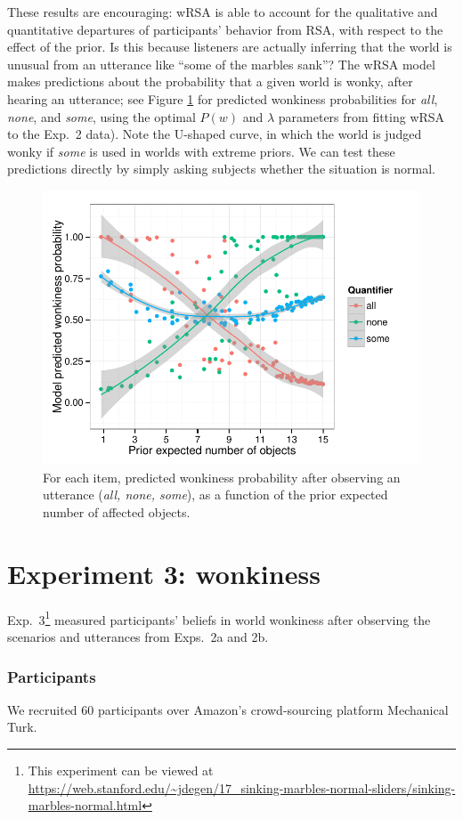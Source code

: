 \documentclass[10pt,letterpaper]{article}
\newcommand{\figref}[1]{Figure \ref{#1}}
\begin{document}
These results are encouraging: wRSA is able to account for the qualitative and quantitative departures of participants' behavior from RSA, with respect to the effect of the prior.
Is this because listeners are actually inferring that the world is unusual from an utterance like ``some of the marbles sank''?
The wRSA model makes predictions about the probability that a given world is wonky, after hearing an utterance; see \figref{fig:wonkymodel} for predicted wonkiness probabilities for \emph{all}, \emph{none}, and \emph{some}, using the  optimal $P(w)$ and $\lambda$ parameters from fitting wRSA to the Exp.~2 data).
Note the U-shaped curve, in which the world is judged wonky if \emph{some} is used in worlds with extreme priors.
 We can test these predictions directly by simply asking subjects whether the situation is normal.



\begin{figure}
	\includegraphics[width=.5\textwidth]{pics/model-wonkiness-uniform}
	\caption{For each item, predicted wonkiness probability after observing an utterance (\emph{all, none, some}), as a function of the prior expected number of affected objects.}
	\label{fig:wonkymodel}	
\end{figure}

\section{Experiment 3: wonkiness}

Exp.~3\footnote{This experiment can be viewed at \url{https://web.stanford.edu/~jdegen/17_sinking-marbles-normal-sliders/sinking-marbles-normal.html}} measured participants' beliefs in world wonkiness after observing the scenarios and utterances from Exps.~2a and 2b.

\subsubsection{Participants}
We recruited 60 participants over Amazon's crowd-sourcing platform Mechanical Turk.
\end{document}
